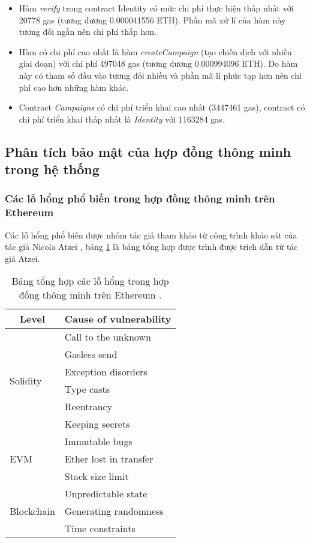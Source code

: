 \documentclass[../main-report.tex]{subfiles}
\begin{document}
\begin{itemize}
\item Hàm \textit{verify} trong contract Identity có mức chi phí thực hiện thấp nhất với 20778 gas (tương đương 0.000041556 ETH). Phần mã xử lí của hàm này tương đối ngắn nên chi phí thấp hơn.
\item Hàm có chi phí cao nhất là hàm \textit{createCampaign} (tạo chiến dịch với nhiều giai đoạn) với chi phí 497048 gas (tương đương 0.000994096 ETH). Do hàm này có tham số đầu vào tương đối nhiều và phần mã lí phức tạp hơn nên chi phí cao hơn những hàm khác.
\item Contract \textit{Campaigns} có chi phí triển khai cao nhất (3447461 gas), contract có chi phí triển khai thấp nhất là \textit{Identity} với 1163284 gas.
\end{itemize}
\subsection{Phân tích bảo mật của hợp đồng thông minh trong hệ thống}
\subsubsection{Các lỗ hổng phổ biến trong hợp đồng thông minh trên Ethereum}
Các lỗ hổng phổ biến được nhóm tác giả tham khảo từ công trình khảo sát của tác giả Nicola Atzei \cite{atzei2016survey}, bảng \ref{tab:smartcontract-vuln} là bảng tổng hợp được trình được trích dẫn từ tác giả Atzei.

\begin{table}[!ht]
\centering
\begin{tabular}{|l|l|}
\hline
\multicolumn{1}{|c|}{\textbf{Level}} & \multicolumn{1}{c|}{\textbf{Cause of vulnerability}} \\ \hline
\multirow{6}{*}{Solidity} & Call to the unknown \\ \cline{2-2} 
 & Gasless send \\ \cline{2-2} 
 & Exception disorders \\ \cline{2-2} 
 & Type casts \\ \cline{2-2} 
 & Reentrancy \\ \cline{2-2} 
 & Keeping secrets \\ \hline
\multirow{3}{*}{EVM} & Immutable bugs \\ \cline{2-2} 
 & Ether lost in transfer \\ \cline{2-2} 
 & Stack size limit \\ \hline
\multirow{3}{*}{Blockchain} & Unpredictable state \\ \cline{2-2} 
 & Generating randomness \\ \cline{2-2} 
 & Time constraints \\ \hline
\end{tabular}
\caption{Bảng tổng hợp các lỗ hổng trong hợp đồng thông minh trên Ethereum \cite{atzei2016survey}.}
\label{tab:smartcontract-vuln}
\end{table}
\end{document}
